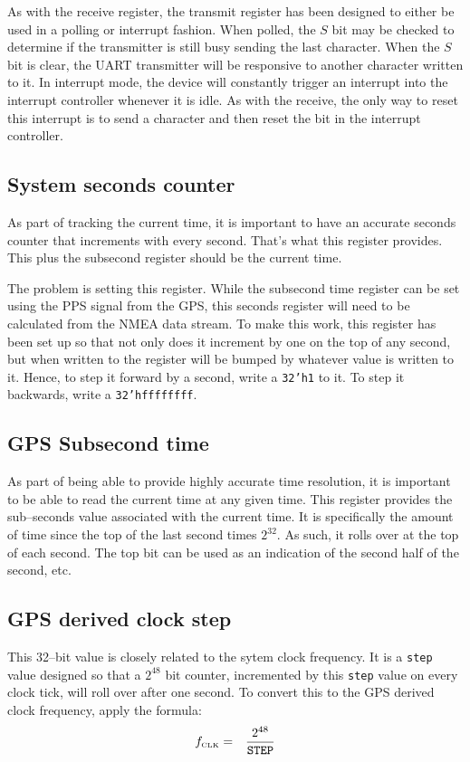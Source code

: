 \documentclass{gqtekspec}
\begin{document}
As with the receive register, the transmit register has been designed to either
be used in a polling or interrupt fashion.  When polled, the $S$ bit may be
checked to determine if the transmitter is still busy sending the last
character.  When the $S$ bit is clear, the UART transmitter will be responsive
to another character written to it.  In interrupt mode, the device will
constantly trigger an interrupt into the interrupt controller whenever  it is
idle.  As with the receive, the only way to reset this interrupt is to send
a character and then reset the bit in the interrupt controller.

\subsection{System seconds counter}
As part of tracking the current time, it is important to have an accurate
seconds counter that increments with every second.  That's what this register
provides.  This plus the subsecond register should be the current time.

The problem is setting this register.  While the subsecond time register can be
set using the PPS signal from the GPS, this seconds register will need to be
calculated from the NMEA data stream.  To make this work, this register has been
set up so that not only does it increment by one on the top of any second, but
when written to the register will be bumped by whatever value is written to it.
Hence, to step it forward by a second, write a {\tt 32'h1} to it.  To step it
backwards, write a {\tt 32'hffffffff}.

\subsection{GPS Subsecond time}
As part of being able to provide highly accurate time resolution, it is 
important to be able to read the current time at any given time.  This
register provides the sub--seconds value associated with the current time.
It is specifically the amount of time since the top of the last second
times $2^{32}$.  As such, it rolls over at the top of each second.  The
top bit can be used as an indication of the second half of the second, etc.

\subsection{GPS derived clock step}
This 32--bit value is closely related to the sytem clock frequency.  It is a 
{\tt step} value designed so that a $2^{48}$ bit counter, incremented by this
{\tt step} value on every clock tick, will roll over after one second.  To
convert this to the GPS derived clock frequency, apply the formula:
\begin{eqnarray}
f_{\mbox{\tiny CLK}} &=& \frac{2^{48}}{\mbox{\tt STEP}}
\end{eqnarray}
\end{document}
